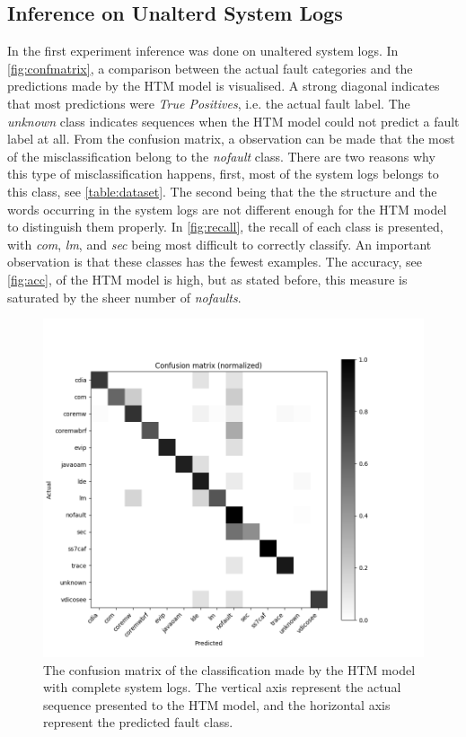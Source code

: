 \subsection{Inference on Unalterd System Logs}
In the first experiment inference was done on unaltered system logs. In \autoref{fig:confmatrix}, a comparison between the actual fault categories and the predictions made by the HTM model is visualised. A strong diagonal indicates that most predictions were \textit{True Positives}, i.e. the actual fault label. The \textit{unknown} class indicates sequences when the HTM model could not predict a fault label at all. From the confusion matrix, a observation can be made that the most of the misclassification belong to the \textit{nofault} class. There are two reasons why this type of misclassification happens, first, most of the system logs belongs to this class, see \autoref{table:dataset}. The second being that the the structure and the words occurring in the system logs are not different enough for the HTM model to distinguish them properly. In \autoref{fig:recall}, the recall of each class is presented, with \textit{com}, \textit{lm}, and \textit{sec} being most difficult to correctly classify. An important observation is that these classes has the fewest examples. The accuracy, see \autoref{fig:acc}, of the HTM model is high, but as stated before, this measure is saturated by the sheer number of \textit{nofaults}.

\clearpage

\begin{figure}[H]
    \centering
    \includegraphics[width=\textwidth]{results/figures/256_32_0pcterror.png}
    \caption{The confusion matrix of the classification made by the HTM model with complete system logs. The vertical axis represent the actual sequence presented to the HTM model, and the horizontal axis represent the predicted fault class.}
    \label{fig:confmatrix}
\end{figure}



